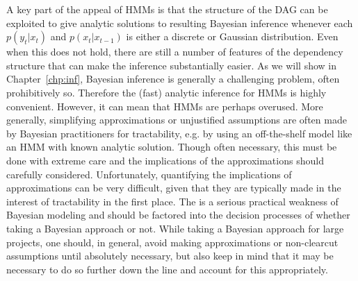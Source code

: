 A key part of the appeal of HMMs is that the structure of the
DAG can be exploited to give analytic solutions to resulting Bayesian inference whenever each $p(y_t | x_t)$ 
and $p(x_t | x_{t-1})$ is either a discrete or Gaussian distribution. Even when this does not hold, there 
are still a number of features of the dependency structure that can make the inference substantially easier.
As we will show in Chapter~\ref{chp:inf}, Bayesian inference is generally a challenging problem, often prohibitively so.
Therefore the (fast) analytic inference for HMMs is highly convenient.  However, it can mean that HMMs are perhaps overused.
More generally, simplifying approximations or unjustified assumptions are often made by Bayesian practitioners 
for tractability, e.g. by using an off-the-shelf model like an HMM with known analytic solution. Though often necessary, 
this must be done with extreme care and the implications of the approximations should carefully considered.  Unfortunately, 
quantifying the implications of approximations can be very difficult, given that they are typically made in the interest
of tractability in the first place.  The is a serious practical weakness of Bayesian modeling and should be factored 
into the decision processes of whether taking a Bayesian approach or not.  While taking a Bayesian approach for large projects, 
one should, in general, avoid making approximations or non-clearcut assumptions until absolutely necessary, but also 
keep in mind that it may be necessary to do so further down the line and account for this appropriately.